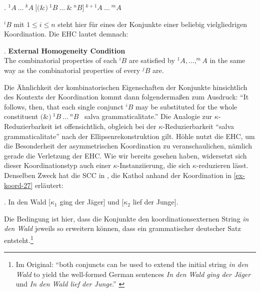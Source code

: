 \ex. \label{ex-hoehle-90-1} $^1\!A \ \ldots \ ^k\!A \ [($\&$) \ ^1\!B \ \ldots \ \& \ ^n\!B] \ ^{k+1}\!A \ \ldots \ ^m\!A$ \hfill \citep[(1)]{Hoehle:90}

$^i\!B$ mit $1 \leq i \leq n$ steht hier für eines der Konjunkte einer beliebig vielgliedrigen Koordination. Die EHC lautet demnach: 

\ex. \label{ex-hoehle-90-3}
{\bf External Homogeneity Condition} \hfill \citep[(3)]{Hoehle:90} \\
The combinatorial properties of each $^i\!B$ are satisfied by $^1\!A , \ldots , ^m\!A$ in the same way as the combinatorial properties of every $^j\!B$ are.

Die Ähnlichkeit der kombinatorischen Eigenschaften der Konjunkte hinsichtlich des Kontexts der Koordination kommt dann folgenderma\ss en zum Ausdruck: "`It follows, then, that each single conjunct $^i\!B$ may be substituted for the whole constituent \glq$($\&$) \ ^1\!B \ \ldots \ ^n\!B$\grq~ salva grammaticalitate."' \citep[222]{Hoehle:90} Die Analogie zur $\kappa$-Reduzierbarkeit ist offensichtlich, obgleich bei der $\kappa$-Reduzierbarkeit "`salva grammaticalitate"' nach der Ellipsenrekonstruktion gilt. Höhle nutzt die EHC, um die Besonderheit der asymmetrischen Koordination zu veranschaulichen, nämlich gerade die Verletzung der EHC. Wie wir bereits gesehen haben, widersetzt sich dieser Koordinationstyp auch einer $\kappa$-Instanziierung, die sich $\kappa$-reduzieren lässt. Denselben Zweck hat die SCC in \cite{Kathol:99}, die Kathol anhand der Koordination in \ref{ex-koord-27} erläutert:

\ex. \label{ex-koord-27}In den Wald [$\kappa_1$ ging der Jäger] und [$\kappa_2$ lief der Junge].\hfill \citep[(1)]{Kathol:99}   

Die Bedingung ist hier, dass die Konjunkte den koordinationsexternen String {\it in den Wald} jeweils so erweitern können, dass ein grammatischer deutscher Satz entsteht.\footnote{Im Original: "`both conjuncts can be used to extend the initial string {\it in den Wald} to yield the well-formed German sentences {\it In den Wald ging der Jäger} und {\it In den Wald lief der Junge}."' \citep[305]{Kathol:99}} 

